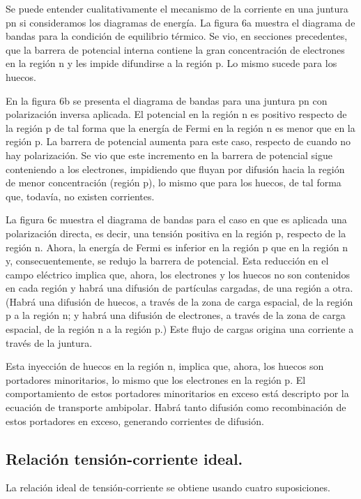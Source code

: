 \documentclass[12pt,a4paper]{article}
\begin{document}
Se puede entender cualitativamente el mecanismo de la corriente en una juntura pn si consideramos los diagramas de energía. La figura 6a muestra el diagrama de bandas para la condición de equilibrio térmico. Se vio, en secciones precedentes, que la barrera de potencial interna contiene la gran concentración de electrones en la región n y les impide difundirse a la región p. Lo mismo sucede para los huecos.

En la figura 6b se presenta el diagrama de bandas para una juntura pn con polarización inversa aplicada. El potencial en la región n es positivo respecto de la región p de tal forma que la energía de Fermi en la región n es menor que en la región p. La barrera de potencial aumenta para este caso, respecto de cuando no hay polarización. Se vio que este incremento en la barrera de potencial sigue conteniendo a los electrones, impidiendo que fluyan por difusión hacia la región de menor concentración (región p), lo mismo que para los huecos, de tal forma que, todavía, no existen corrientes.

La figura 6c muestra el diagrama de bandas para el caso en que es aplicada una polarización directa, es decir, una tensión positiva en la región p, respecto de la región n. Ahora, la energía de Fermi es inferior en la región p que en la región n y, consecuentemente, se redujo la barrera de potencial. Esta reducción en el campo eléctrico implica que, ahora, los electrones y los huecos no son contenidos en cada región y habrá una difusión de partículas cargadas, de una región a otra. (Habrá una difusión de huecos, a través de la zona de carga espacial, de la región p a la región n; y habrá una difusión de electrones, a través de la zona de carga espacial, de la región n a la región p.) Este flujo de cargas origina una corriente a través de la juntura.

Esta inyección de huecos en la región n, implica que, ahora, los huecos son portadores minoritarios, lo mismo que los electrones en la región p. El comportamiento de estos portadores minoritarios en exceso está descripto por la ecuación de transporte ambipolar. Habrá tanto difusión como recombinación de estos portadores en exceso, generando corrientes de difusión.

\subsection{Relación tensión-corriente ideal.}

La relación ideal de tensión-corriente se obtiene usando cuatro suposiciones.
\end{document}
